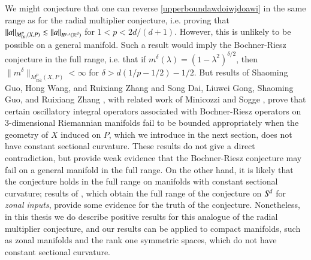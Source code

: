 We might conjecture that one can reverse \eqref{upperboundawdoiwjdoawi} in the same range as for the radial multiplier conjecture, i.e. proving that $\| a \|_{M^p_{\text{Dil}}(X,P)} \lesssim \| a \|_{R^{p,s}(\operatorname{\mathbb{R}}^d)}$ for $1 < p < 2d/(d+1)$. However, this is unlikely to be possible on a general manifold. Such a result would imply the Bochner-Riesz conjecture in the full range, i.e. that if $m^\delta(\lambda) = (1 - \lambda^2)^{\delta/2}$, then $\| m^\delta \|_{M^p_{\text{Dil}}(X,P)} < \infty$ for $\delta > d(1/p - 1/2) - 1/2$. But results of Shaoming Guo, Hong Wang, and Ruixiang Zhang \cite{GuoWangZhang} and Song Dai, Liuwei Gong, Shaoming Guo, and Ruixiang Zhang \cite{DaiGongGuoZhang}, with related work of Minicozzi and Sogge \cite{Minicozzi}, prove that certain oscillatory integral operators associated with Bochner-Riesz operators on $3$-dimensional Riemannian manifolds fail to be bounded appropriately when the geometry of $X$ induced on $P$, which we introduce in the next section, does not have constant sectional curvature. These results do not give a direct contradiction, but provide weak evidence that the Bochner-Riesz conjecture may fail on a general manifold in the full range. On the other hand, it is likely that the conjecture holds in the full range on manifolds with constant sectional curvature; results of \cite{Alladi}, which obtain the full range of the conjecture on ${S}^{\!{d}}$ for \emph{zonal inputs}, provide some evidence for the truth of the conjecture. Nonetheless, in this thesis we do describe positive results for this analogue of the radial multiplier conjecture, and our results can be applied to compact manifolds, such as zonal manifolds and the rank one symmetric spaces, which do not have constant sectional curvature.


%
%
%
%
%

